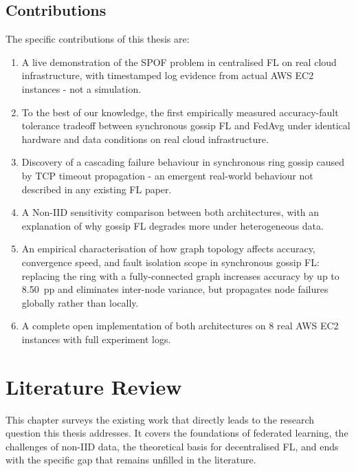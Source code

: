 \documentclass[12pt]{report}
\begin{document}
\section{Contributions}

The specific contributions of this thesis are:

\begin{enumerate}
  \item A live demonstration of the SPOF problem in centralised FL on real cloud
  infrastructure, with timestamped log evidence from actual AWS EC2 instances -
  not a simulation.

  \item To the best of our knowledge, the first empirically measured
  accuracy-fault tolerance tradeoff between synchronous gossip FL and FedAvg
  under identical hardware and data conditions on real cloud infrastructure.

  \item Discovery of a cascading failure behaviour in synchronous ring gossip
  caused by TCP timeout propagation - an emergent real-world behaviour not described
  in any existing FL paper.

  \item A Non-IID sensitivity comparison between both architectures, with an
  explanation of why gossip FL degrades more under heterogeneous data.

  \item An empirical characterisation of how graph topology affects accuracy,
  convergence speed, and fault isolation scope in synchronous gossip FL: replacing
  the ring with a fully-connected graph increases accuracy by up to 8.50~pp and
  eliminates inter-node variance, but propagates node failures globally rather
  than locally.

  \item A complete open implementation of both architectures on 8 real AWS EC2
  instances with full experiment logs.
\end{enumerate}

\chapter{Literature Review}

This chapter surveys the existing work that directly leads to the research
question this thesis addresses. It covers the foundations of federated learning,
the challenges of non-IID data, the theoretical basis for decentralised FL, and
ends with the specific gap that remains unfilled in the literature.
\end{document}
